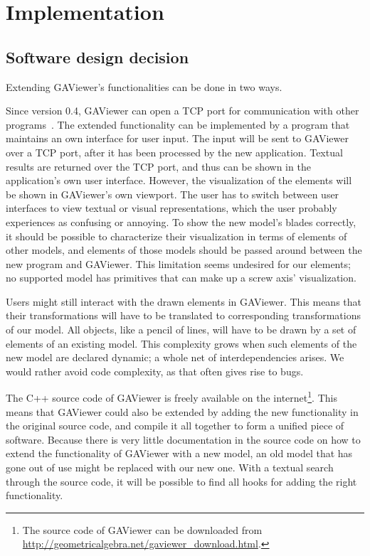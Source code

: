 \section{Implementation}
\label{ch:implementation}


\subsection{Software design decision}
Extending GAViewer's functionalities can be done in two ways.  

Since version 0.4, GAViewer can open a TCP port for communication with other programs~\cite{GAViewer}.  The extended functionality can be implemented by a program that maintains an own interface for user input.  The input will be sent to GAViewer over a TCP port, after it has been processed by the new application.  Textual results are returned over the TCP port, and thus can be shown in the application's own user interface.  However, the visualization of the elements will be shown in GAViewer's own viewport.  The user has to switch between user interfaces to view textual or visual representations, which the user probably experiences as confusing or annoying.  To show the new model's blades correctly, it should be possible to characterize their visualization in terms of elements of other models, and elements of those models should be passed around between the new program and GAViewer.  This limitation seems undesired for our elements; no supported model has primitives that can make up a screw axis' visualization.  

Users might still interact with the drawn elements in GAViewer.  This means that their transformations will have to be translated to corresponding transformations of our model.  All objects, like a pencil of lines, will have to be drawn by a set of elements of an existing model.  This complexity grows when such elements of the new model are declared dynamic; a whole net of interdependencies arises.  We would rather avoid code complexity, as that often gives rise to bugs.

The C++ source code of GAViewer is freely available on the internet\footnote{The source code of GAViewer can be downloaded from \url{http://geometricalgebra.net/gaviewer\_download.html}.}.  This means that GAViewer could also be extended by adding the new functionality in the original source code, and compile it all together to form a unified piece of software.  Because there is very little documentation in the source code on how to extend the functionality of GAViewer with a new model, an old model that has gone out of use might be replaced with our new one.  With a textual search through the source code, it will be possible to find all hooks for adding the right functionality.  

